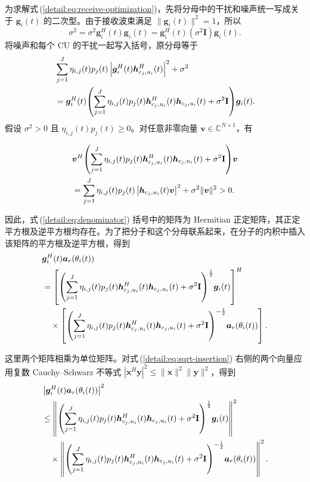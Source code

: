 \documentclass[11pt,a4paper]{ctexart}
\begin{document}
为求解式\,(\ref{detail:eq:receive-optimization})，先将分母中的干扰和噪声统一写成关于 $\bm g_i(t)$ 的二次型。由于接收波束满足 $\|\bm g_i(t)\|^2=1$，所以
\begin{equation}
\sigma^2=\sigma^2\bm g_i^H(t)\bm g_i(t)
=\bm g_i^H(t)(\sigma^2\mathbf I)\bm g_i(t).
\end{equation}
将噪声和每个 CU 的干扰一起写入括号，原分母等于
\begin{align}\label{detail:eq:denominator}
&\sum_{j=1}^J\eta_{i,j}(t)p_j(t)
\left|\bm g_i^H(t)\bm h_{c_j,u_i}^{H}(t)\right|^2+\sigma^2\notag\\
&=\bm g_i^H(t)\!\left(\sum_{j=1}^J\eta_{i,j}(t)p_j(t)
\bm h_{c_j,u_i}^{H}(t)\bm h_{c_j,u_i}(t)+\sigma^2\mathbf I\right)\!\bm g_i(t).
\end{align}
假设 $\sigma^2>0$ 且 $\eta_{i,j}(t)p_j(t)\ge0$。对任意非零向量 $\bm v\in\mathbb C^{N\times1}$，有
\begin{samepage}
\begin{align}
&\bm v^H\!\left(\sum_{j=1}^J\eta_{i,j}(t)p_j(t)
\bm h_{c_j,u_i}^{H}(t)\bm h_{c_j,u_i}(t)+\sigma^2\mathbf I\right)\!\bm v\notag\\
&=\sum_{j=1}^J\eta_{i,j}(t)p_j(t)
\left|\bm h_{c_j,u_i}(t)\bm v\right|^2+\sigma^2\|\bm v\|^2>0.
\end{align}
\end{samepage}
\begin{samepage}
因此，式\,(\ref{detail:eq:denominator}) 括号中的矩阵为 Hermitian 正定矩阵，其正定平方根及逆平方根均存在。为了把分子和这个分母联系起来，在分子的内积中插入该矩阵的平方根及逆平方根，得到
\begin{align}\label{detail:eq:sqrt-insertion}
&\bm g_i^H(t)\bm a_r(\theta_i(t))\notag\\
&=\left[\left(\sum_{j=1}^J\eta_{i,j}(t)p_j(t)
\bm h_{c_j,u_i}^{H}(t)\bm h_{c_j,u_i}(t)+\sigma^2\mathbf I\right)^{\frac12}\!\bm g_i(t)\right]^H\notag\\
&\quad\times\left[\left(\sum_{j=1}^J\eta_{i,j}(t)p_j(t)
\bm h_{c_j,u_i}^{H}(t)\bm h_{c_j,u_i}(t)+\sigma^2\mathbf I\right)^{-\frac12}\!\bm a_r(\theta_i(t))\right].
\end{align}
\end{samepage}
\begin{samepage}
这里两个矩阵相乘为单位矩阵。对式\,(\ref{detail:eq:sqrt-insertion}) 右侧的两个向量应用复数 Cauchy--Schwarz 不等式 $|\bm x^H\bm y|^2\le\|\bm x\|^2\|\bm y\|^2$，得到
\begin{align}\label{detail:eq:cs-norms}
&\left|\bm g_i^H(t)\bm a_r(\theta_i(t))\right|^2\notag\\
&\le\left\|\left(\sum_{j=1}^J\eta_{i,j}(t)p_j(t)
\bm h_{c_j,u_i}^{H}(t)\bm h_{c_j,u_i}(t)+\sigma^2\mathbf I\right)^{\frac12}\!\bm g_i(t)\right\|^2\notag\\
&\quad\times\left\|\left(\sum_{j=1}^J\eta_{i,j}(t)p_j(t)
\bm h_{c_j,u_i}^{H}(t)\bm h_{c_j,u_i}(t)+\sigma^2\mathbf I\right)^{-\frac12}\!\bm a_r(\theta_i(t))\right\|^2.
\end{align}
\end{samepage}
\end{document}
